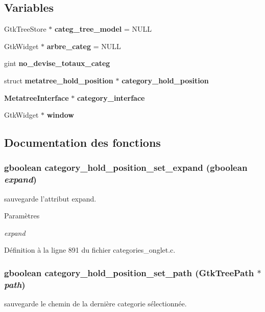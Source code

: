 \subsection*{Variables}
\begin{DoxyCompactItemize}
\item 
GtkTreeStore $\ast$ {\bf categ\_\-tree\_\-model} = NULL
\item 
GtkWidget $\ast$ {\bf arbre\_\-categ} = NULL
\item 
gint {\bf no\_\-devise\_\-totaux\_\-categ}
\item 
struct {\bf metatree\_\-hold\_\-position} $\ast$ {\bf category\_\-hold\_\-position}
\item 
{\bf MetatreeInterface} $\ast$ {\bf category\_\-interface}
\item 
GtkWidget $\ast$ {\bf window}
\end{DoxyCompactItemize}


\subsection{Documentation des fonctions}
\subsubsection[{category\_\-hold\_\-position\_\-set\_\-expand}]{\setlength{\rightskip}{0pt plus 5cm}gboolean category\_\-hold\_\-position\_\-set\_\-expand (gboolean {\em expand})}\label{categories__onglet_8c_a5b685ac483cc1dcc8dc736a644a80651}
sauvegarde l'attribut expand.


\begin{DoxyParams}{Paramètres}
\item[{\em expand}]\end{DoxyParams}


Définition à la ligne 891 du fichier categories\_\-onglet.c.

\subsubsection[{category\_\-hold\_\-position\_\-set\_\-path}]{\setlength{\rightskip}{0pt plus 5cm}gboolean category\_\-hold\_\-position\_\-set\_\-path (GtkTreePath $\ast$ {\em path})}\label{categories__onglet_8c_a07189d15b8fbd91a38070efebee6ee97}
sauvegarde le chemin de la dernière categorie sélectionnée.


